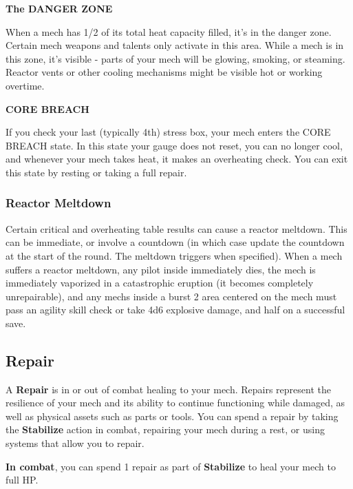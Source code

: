 \begin{center}
  \textbf{The DANGER ZONE}
\end{center}

When a mech has 1/2 of its total heat capacity filled, it's in the danger zone. Certain mech weapons and talents only activate in this area. While a mech is in this zone, it's visible - parts of your mech will be glowing, smoking, or steaming. Reactor vents or other cooling mechanisms might be visible hot or working overtime. 

\begin{center}
  \textbf{CORE BREACH}
\end{center}

If you check your last (typically 4th) stress box, your mech enters the CORE BREACH state. In this state your gauge does not reset, you can no longer cool, and whenever your mech takes heat, it makes an overheating check. You can exit this state by resting or taking a full repair.

\subsubsection{Reactor Meltdown}

Certain critical and overheating table results can cause a reactor meltdown. This can be immediate, or involve a countdown (in which case update the countdown at the start of the round. The meltdown triggers when specified). When a mech suffers a reactor meltdown, any pilot inside immediately dies, the mech is immediately vaporized in a catastrophic eruption (it becomes completely unrepairable), and any mechs inside a burst 2 area centered on the mech must pass an agility skill check or take 4d6 explosive damage, and half on a successful save. 

\subsection{Repair}

A \textbf{Repair} is in or out of combat healing to your mech. Repairs represent the resilience of your mech and its ability to continue functioning while damaged, as well as physical assets such as parts or tools. You can spend a repair by taking the \textbf{Stabilize} action in combat, repairing your mech during a rest, or using systems that allow you to repair. 

\textbf{In combat}, you can spend 1 repair as part of \textbf{Stabilize} to heal your mech to full HP.

